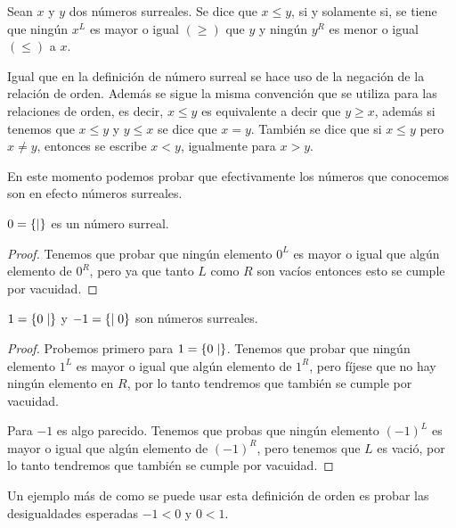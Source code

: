     \begin{definition}
        Sean $x$ y $y$ dos n\'umeros surreales. Se dice que $x\le y$, si y solamente si, se tiene que ning\'un $x^L$ es mayor o igual $(\ge)$ que $y$ y ningún $y^R$ es menor o igual $(\le)$ a $x$.
    \end{definition}

    Igual que en la definici\'on de n\'umero surreal se hace uso de la negaci\'on de la relaci\'on de orden. Adem\'as se sigue la misma convención que se utiliza para las relaciones de orden, es decir, $x\le y$ es equivalente a decir que $y\ge x$, adem\'as si tenemos que $x\le y$ y $y\le x$ se dice que $x=y$. Tambi\'en se dice que si $x\le y$ pero $x \not= y$, entonces se escribe $x < y$, igualmente para $x > y$.

    En este momento podemos probar que efectivamente los n\'umeros que conocemos son en efecto n\'umeros surreales.

    \begin{theorem}
        $0=\left\{\mid \right\}$ es un n\'umero surreal.
    \end{theorem}

    \begin{proof}
        Tenemos que probar que ning\'un elemento $0^L$ es mayor o igual que algún elemento de $0^R$, pero ya que tanto $L$ como $R$ son vac\'ios entonces esto se cumple por vacuidad. 
    \end{proof}

    \begin{theorem}
        $1=\left\{0\mid \right\}$ y $-1=\left\{\mid 0\right\}$ son n\'umeros surreales.
    \end{theorem}

    \begin{proof}
        Probemos primero para $1=\left\{0\mid \right\}$. Tenemos que probar que ning\'un elemento $1^L$ es mayor o igual que algún elemento de $1^R$, pero f\'ijese que no hay ning\'un elemento en $R$, por lo tanto tendremos que tambi\'en se cumple por vacuidad.

        Para $-1$ es algo parecido. Tenemos que probas que ning\'un elemento $(-1)^L$ es mayor o igual que alg\'un elemento de $(-1)^R$, pero tenemos que $L$ es vaci\'o, por lo tanto tendremos que tambi\'en se cumple por vacuidad.
    \end{proof}

    Un ejemplo m\'as de como se puede usar esta definici\'on de orden es probar las desigualdades esperadas $-1< 0$ y $0<1$.

